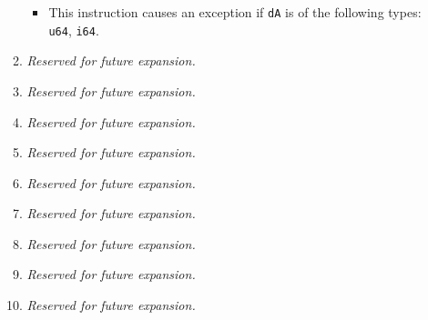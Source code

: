 \documentclass{article}
\begin{document}
\begin{itemize}
\begin{enumerate}
\begin{itemize}
				\item This instruction causes an exception if \texttt{dA}
				is of the following types:  \texttt{u64}, \texttt{i64}.
				\end{itemize}
			\item \textit{Reserved for future expansion.}

			\item \textit{Reserved for future expansion.}
			\item \textit{Reserved for future expansion.}
			\item \textit{Reserved for future expansion.}
			\item \textit{Reserved for future expansion.}

			\item \textit{Reserved for future expansion.}
			\item \textit{Reserved for future expansion.}
			\item \textit{Reserved for future expansion.}
			\item \textit{Reserved for future expansion.}
			\end{enumerate}
		\end{itemize}
\end{document}
